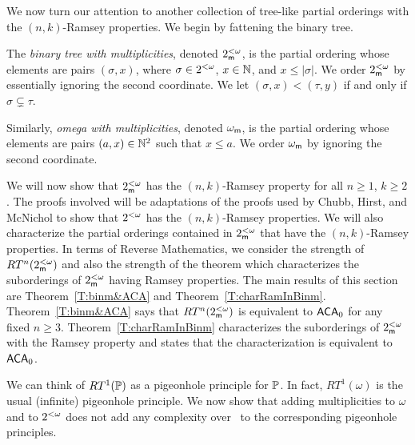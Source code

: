 We now turn our attention to another collection of
tree-like partial orderings with the $(n,k)$-Ramsey properties.
We begin by fattening the binary tree.

\begin{definition}\label{D:withMultis}
The \textit{binary tree with multiplicities}, \index{$\binm$}
denoted $\binm$, is the partial ordering whose elements are pairs $(\sigma,x)$,
where $\sigma\in2^{<\omega}$, $x\in\mathbb{N}$, and $x\leq|\sigma|$.
We order $\binm$ by essentially ignoring the second coordinate.
We let $(\sigma,x)<(\tau,y)$ if and only if $\sigma\subsetneq\tau$.

Similarly, \textit{omega with multiplicities}, denoted $\omegam$, \index{$\omegam$}
is the partial ordering whose elements are pairs $(a,x)\in\mathbb{N}^2$
such that $x\leq a$.
We order $\omegam$ by ignoring the second coordinate.
\end{definition}

We will now show that $\binm$ has the $(n,k)$-Ramsey property
for all $n\geq 1$, $k\geq 2$.
The proofs involved will be adaptations of the proofs used
by Chubb, Hirst, and McNichol \cite{CHM} to show that $2^{<\omega}$ has the
$(n,k)$-Ramsey properties.
We will also characterize the partial orderings contained in $\binm$
that have the $(n,k)$-Ramsey properties.
In terms of Reverse Mathematics,
we consider the strength of $RT^n(2^{<\omega}_{\mathsf{m}})$ and
also the strength of the theorem which characterizes
the suborderings of $\binm$ having Ramsey properties.
The main results of this section are Theorem~\ref{T:binm&ACA} and Theorem~\ref{T:charRamInBinm}.
Theorem~\ref{T:binm&ACA} says that $RT^n(2^{<\omega}_{\mathsf{m}})$ is equivalent
to $\mathsf{ACA}_0$ for any fixed $n\geq 3$.
Theorem~\ref{T:charRamInBinm} characterizes the suborderings of $\binm$
with the Ramsey property and states that the characterization
is equivalent to $\mathsf{ACA}_0$.

We can think of $RT^1(\mathbb{P})$ as a pigeonhole principle for $\mathbb{P}$.
In fact, $RT^1(\omega)$ is the usual (infinite) pigeonhole principle.
We now show that adding multiplicities to $\omega$ and to $2^{<\omega}$
does not add any complexity over \RCAo\ to the corresponding
pigeonhole principles.

